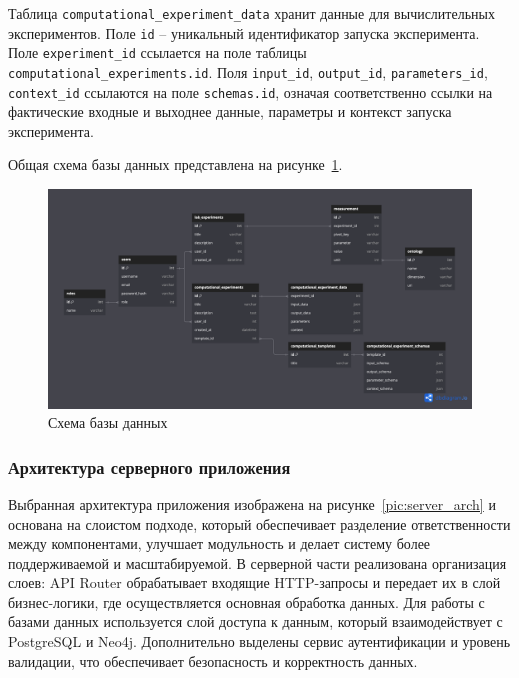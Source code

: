 Таблица \texttt{computational\_experiment\_data} хранит данные для вычислительных экспериментов. Поле \texttt{id} -- уникальный идентификатор запуска эксперимента. Поле \texttt{experiment\_id} ссылается на поле таблицы \texttt{computational\_experiments.id}. Поля \texttt{input\_id}, \texttt{output\_id}, \texttt{parameters\_id}, \texttt{context\_id} ссылаются на поле \texttt{schemas.id}, означая соответственно ссылки на фактические входные и выходнее данные, параметры и контекст запуска эксперимента.


Общая схема базы данных представлена на рисунке~\ref{pic:db}.

\begin{figure}[H]
	\centering
	\includegraphics[width=\linewidth]{chapters/img/database_scheme.png}
	\caption{Схема базы данных}
	\label{pic:db}
\end{figure}


\subsubsection{Архитектура серверного приложения}

Выбранная архитектура приложения изображена на рисунке~\ref{pic:server_arch} и основана на слоистом подходе, который обеспечивает разделение ответственности между компонентами, улучшает модульность и делает систему более поддерживаемой и масштабируемой. В серверной части реализована организация слоев: API Router обрабатывает входящие HTTP-запросы и передает их в слой бизнес-логики, где осуществляется основная обработка данных. Для работы с базами данных используется слой доступа к данным, который взаимодействует с PostgreSQL и Neo4j. Дополнительно выделены сервис аутентификации и уровень валидации, что обеспечивает безопасность и корректность данных.

